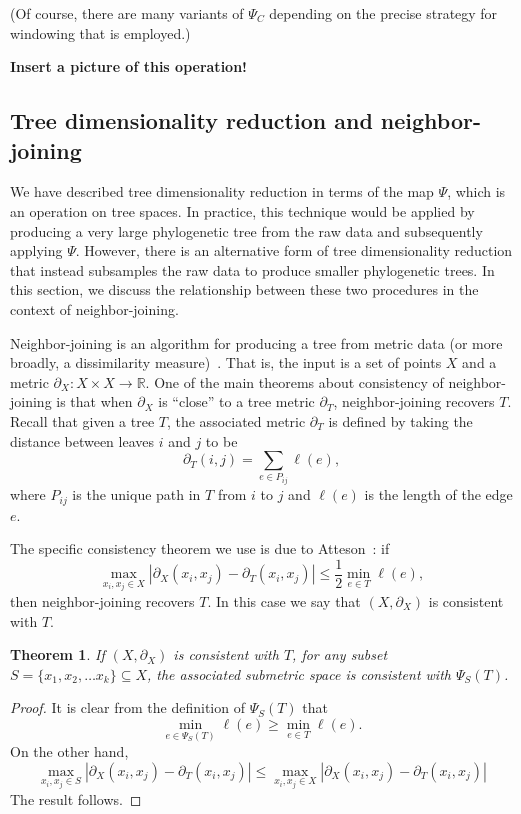 \documentclass[a4paper,11pt]{article}
\newtheorem{theorem}{Theorem}
\begin{document}
(Of course, there are many variants of $\Psi_C$ depending on the precise strategy for windowing that is employed.)

{\bf Insert a picture of this operation!}

\subsection{Tree dimensionality reduction and neighbor-joining}

We have described tree dimensionality reduction in terms of the map $\Psi$, which is an operation on tree spaces.
In practice, this technique would be applied by producing a very large phylogenetic tree from the raw data and subsequently applying $\Psi$.
However, there is an alternative form of tree dimensionality reduction that instead subsamples the raw data to produce smaller phylogenetic trees.
In this section, we discuss the relationship between these two procedures in the context of neighbor-joining.

Neighbor-joining is an algorithm for producing a tree from metric data (or more broadly, a dissimilarity measure)~\cite{}.
That is, the input is a set of points $X$ and a metric $\partial_X \colon X \times X \to \mathbb{R}$.
One of the main theorems about consistency of neighbor-joining is that when $\partial_X$ is ``close'' to a tree metric $\partial_T$, neighbor-joining recovers $T$.
Recall that given a tree $T$, the associated metric $\partial_T$ is defined by taking the distance between leaves $i$ and $j$ to be 
\[
\partial_T(i,j) = \sum_{e \in P_{ij}} \ell(e),
\]
where $P_{ij}$ is the unique path in $T$ from $i$ to $j$ and $\ell(e)$ is the length of the edge $e$.

The specific consistency theorem we use is due to Atteson~\cite{}: if
\[
\max_{x_i,x_j \in X} |\partial_X(x_i,x_j) - \partial_T(x_i,x_j)| \leq \frac{1}{2} \min_{e \in T} \ell(e),
\]
then neighbor-joining recovers $T$.
In this case we say that $(X, \partial_X)$ is consistent with $T$.

\begin{theorem}
If $(X,\partial_X)$ is consistent with $T$, for any subset $S = \{x_1, x_2, \ldots x_k\} \subseteq X$, the associated submetric space is consistent with $\Psi_S(T)$.
\end{theorem}

\begin{proof}
It is clear from the definition of $\Psi_S(T)$ that 
\[
\min_{e \in \Psi_S(T)} \ell(e) \geq \min_{e \in T} \ell(e).
\]
On the other hand, 
\[
\max_{x_i,x_j \in S} |\partial_X(x_i,x_j) - \partial_T(x_i,x_j)| \leq
\max_{x_i,x_j \in X} |\partial_X(x_i,x_j) - \partial_T(x_i,x_j)| 
\]
The result follows.
\end{proof}
\end{document}
